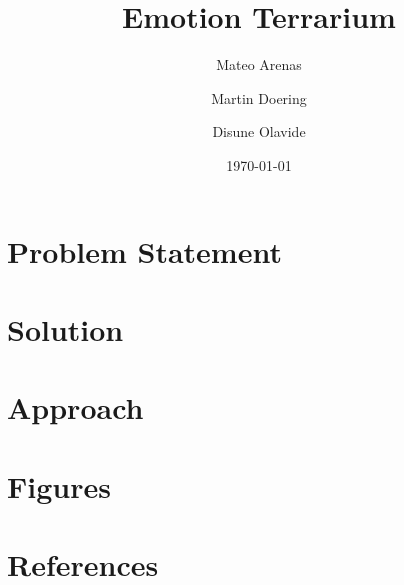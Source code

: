 \documentclass[a4paper]{article}
\title{Emotion Terrarium}
\author{Mateo Arenas \and Martin Doering \and Disune Olavide}
\date{\today}
\begin{document}
\maketitle

\newpage

\tableofcontents

\newpage

\begin{abstract}
    \lipsum[1-4] %
\end{abstract}

\section{Problem Statement}
    \lipsum[5] %

\section{Solution}
    \lipsum[6] %

\section{Approach}
    \lipsum[7-8] %

\section{Figures}

\section*{References}
    \printbibliography
\end{document}
